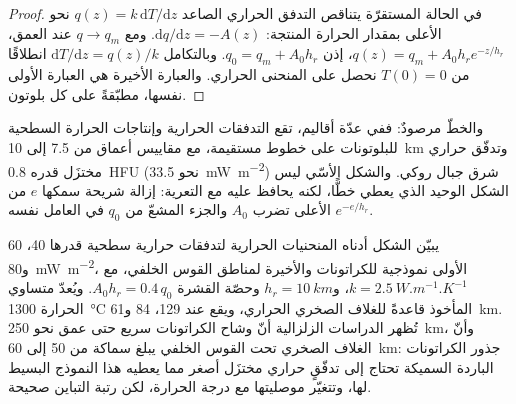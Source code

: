 \begin{proof}
في الحالة المستقرّة يتناقص التدفق الحراري الصاعد $q(z) = k\,\mathrm dT/\mathrm dz$
نحو الأعلى بمقدار الحرارة المنتجة: $\mathrm dq/\mathrm dz = -A(z)$. ومع $q \to q_m$
عند العمق، $q(z) = q_m + A_0h_re^{-z/h_r}$، إذن $q_0 = q_m + A_0h_r$. وبالتكامل
$\mathrm dT/\mathrm dz = q(z)/k$ انطلاقًا من $T(0) = 0$ نحصل على المنحنى الحراري. والعبارة الأخيرة
هي العبارة الأولى نفسها، مطبّقةً على كل بلوتون.
\end{proof}

والخطّ مرصودٌ: ففي عدّة أقاليم، تقع التدفقات الحرارية وإنتاجات الحرارة السطحية
للبلوتونات على خطوط مستقيمة، مع مقاييس أعماق من 7.5 إلى
\qty{10}{km} وتدفّق حراري مختزَل قدره \qty{0.8}{HFU} (نحو
\qty{33.5}{mW.m^{-2}}) شرق جبال روكي. والشكل الأسّي
ليس الشكل الوحيد الذي يعطي خطًّا، لكنه يحافظ عليه مع التعرية: إزالة شريحة سمكها $e$ من الأعلى تضرب
$A_0$ والجزء المشعّ من $q_0$ في العامل نفسه $e^{-e/h_r}$.

يبيّن الشكل أدناه المنحنيات الحرارية لتدفقات حرارية سطحية قدرها 40، 60
و\qty{80}{mW.m^{-2}}، الأولى نموذجية للكراتونات والأخيرة لمناطق القوس الخلفي،
مع $k = \qty{2.5}{W.m^{-1}.K^{-1}}$، و$h_r = \qty{10}{km}$ وحصّة القشرة
$A_0h_r = 0.4\,q_0$. ويُعدّ متساوي الحرارة \qty{1300}{\celsius} المأخوذ
قاعدةً للغلاف الصخري الحراري، ويقع عند 129، 84 و\qty{61}{km}.
تُظهر الدراسات الزلزالية أنّ وشاح الكراتونات سريع حتى عمق نحو \qty{250}{km}، وأنّ
الغلاف الصخري تحت القوس الخلفي يبلغ سماكة من 50 إلى \qty{60}{km}: جذور الكراتونات الباردة السميكة تحتاج إلى
تدفّقٍ حراري مختزَل أصغر مما يعطيه هذا النموذج البسيط لها، وتتغيّر
موصليتها مع درجة الحرارة، لكن رتبة التباين صحيحة.

